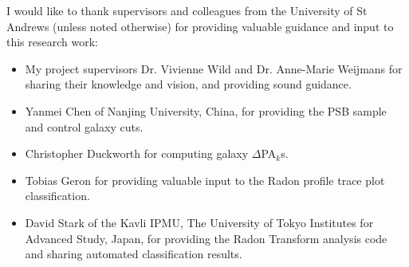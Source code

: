 
I would like to thank supervisors and colleagues from the University of St Andrews (unless noted otherwise) for providing valuable guidance and input to this research work:
\begin{itemize}
    \item My project supervisors Dr. Vivienne Wild and Dr. Anne-Marie Weijmans for sharing their knowledge and vision, and providing sound guidance. 
    \item Yanmei Chen of Nanjing University, China, for providing the PSB sample and control galaxy cuts.
    \item Christopher Duckworth for computing galaxy $\Delta$PA$_{k}$s.
    \item Tobias Geron for providing valuable input to the Radon profile trace plot classification.
    \item David Stark of the Kavli IPMU, The University of Tokyo Institutes for Advanced Study, Japan, for providing the Radon Transform analysis code and sharing automated classification results.
\end{itemize}
